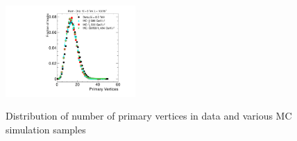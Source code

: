 \begin{figure}
  \begin{center}
      \includegraphics[clip=false, trim=0.0cm 0cm 3.0cm 0cm, width=0.44\textwidth]{figures/muonly/Selection_Comp_Signal_8TeV_PV_BS} \\
  \end{center}
        \caption[Distribution of number of primary vertices in data and various MC simulation samples]
{Distribution of number of primary vertices in data and various MC simulation samples
        }
      \label{fig:PV}
\end{figure}